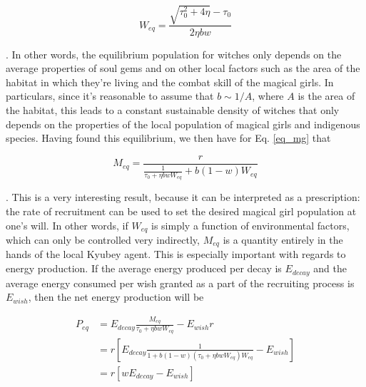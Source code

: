 \documentclass[]{article}
\begin{document}
\begin{equation}\label{eq_pop_w}
W_{eq} = \frac{\sqrt{\tau_0^2+4\eta}-\tau_0}{2\eta bw}
\end{equation}

. In other words, the equilibrium population for witches only depends on the average properties of soul gems and on other local factors such as the area of the habitat in which they're living and the combat skill of the magical girls. In particulars, since it's reasonable to assume that $b \sim 1/A$, where $A$ is the area of the habitat, this leads to a constant sustainable density of witches that only depends on the properties of the local population of magical girls and indigenous species.\newline
Having found this equilibrium, we then have for Eq. \ref{eq_mg} that

\begin{equation}\label{eq_pop_m}
M_{eq} =   \frac{r}{\frac{1}{\tau_0+\eta b w W_{eq}}+b (1-w)W_{eq}}
\end{equation}

. This is a very interesting result, because it can be interpreted as a prescription: the rate of recruitment can be used to set the desired magical girl population at one's will. In other words, if $W_{eq}$ is simply a function of environmental factors, which can only be controlled very indirectly, $M_{eq}$ is a quantity entirely in the hands of the local Kyubey agent. This is especially important with regards to energy production. If the average energy produced per decay is $E_{decay}$ and the average energy consumed per wish granted as a part of the recruiting process is $E_{wish}$, then the net energy production will be

\begin{align}\label{net_power}
P_{eq} &=   E_{decay}\frac{M_{eq}}{\tau_0+\eta b w W_{eq}}-E_{wish}r \\
&= r\left[E_{decay}\frac{1}{1+b(1-w)(\tau_0+\eta b w W_{eq})W_{eq}}-E_{wish}\right] \nonumber \\
& = r\left[wE_{decay}-E_{wish}\right] \nonumber
\end{align}
\end{document}
